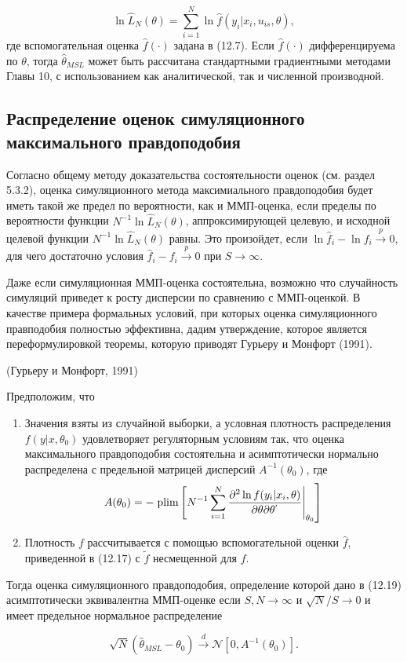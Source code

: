 \begin{equation}
\ln\hat{L}_{N}(\theta)=\sum^{N}_{i=1}\ln\hat{f}(y_i|x_i,u_{is},\theta),
\end{equation}
где вспомогательная оценка $\hat{f}(\cdot)$ задана в (12.7). Если $\hat{f}(\cdot)$ дифференцируема по $\theta$, тогда $\hat{\theta}_{MSL}$ может быть рассчитана стандартными градиентными методами  Главы 10, с использованием как аналитической, так и численной производной.

\subsection{Распределение оценок симуляционного максимального правдоподобия}

Согласно общему методу доказательства состоятельности оценок (см. раздел 5.3.2), оценка симуляционного метода максимиального правдоподобия будет иметь такой же предел по вероятности, как и ММП-оценка, если пределы по вероятности функции $N^{-1}\ln{\hat{L}_N(\theta)}$, аппроксимирующей целевую, и исходной целевой функции $N^{-1}\ln{\hat{L}_N}(\theta)$ равны. Это произойдет, если $\ln{\hat{f}_i}-\ln{f_i} \stackrel{p}{\rightarrow} 0$, для чего достаточно условия $\hat{f}_i-f_i \stackrel{p}{\rightarrow} 0$ при $S \rightarrow \infty$.

Даже если симуляционная ММП-оценка состоятельна, возможно что случайность симуляций  приведет к росту дисперсии по сравнению с ММП-оценкой. В качестве примера формальных условий, при которых оценка симуляционного правподобия полностью эффективна, дадим утверждение, которое является переформулировкой теоремы, которую приводят Гурьеру и Монфорт (1991).

\begin{proposition}
(Гурьеру и Монфорт, 1991)

Предположим, что
\begin{enumerate}
\item Значения взяты из случайной выборки, а условная плотность распределения $f(y|x,\theta_0)$ удовлетворяет регуляторным условиям так, что оценка максимального правдоподобия состоятельна и асимптотически нормально распределена с предельной матрицей дисперсий $A^{-1}(\theta_0)$, где
\[
A(\theta_0)=-\left. \mathrm{plim }\left[ N^{-1}\sum^{N}_{i=1}\dfrac{{\partial}^{2}\ln f(y_i|x_i,\theta)}{\partial\theta\partial\theta^{'}} \right|_{ \theta_{0}}\right] 
\]

\item Плотность $f$ рассчитывается с помощью вспомогательной оценки $\hat{f}$, приведенной в (12.17) с $\tilde{f}$ несмещенной для $f$.
\end{enumerate}

Тогда оценка симуляционного правдоподобия, определение которой дано в (12.19) асимптотически эквивалентна ММП-оценке если $S,N \rightarrow \infty$ и $\sqrt{N}/S \rightarrow 0$ и имеет предельное нормальное распределение 


\begin{equation}
\sqrt{N}(\hat{\theta}_{MSL}-\theta_0)\stackrel{d}{\rightarrow} \mathcal{N}[0,A^{-1}(\theta_0)].
\end{equation}
\end{proposition}

